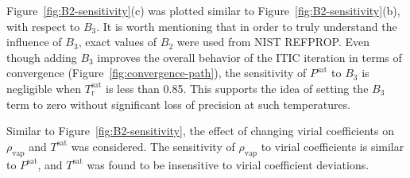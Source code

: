 \documentclass[5p,times]{elsarticle}
\begin{document}
Figure~\ref{fig:B2-sensitivity}(c) was plotted similar to Figure~\ref{fig:B2-sensitivity}(b), with respect to $B_3$. It is worth mentioning that in order to truly understand the influence of $B_3$, exact values of $B_2$ were used from NIST REFPROP. Even though adding $B_3$ improves the overall behavior of the ITIC iteration in terms of convergence (Figure~\ref{fig:convergence-path}), the sensitivity of $P^{\mathrm{sat}}$ to $B_3$ is negligible when $T_\mathrm{r}^\mathrm{sat}$ is less than 0.85. This supports the idea of setting the $B_3$ term to zero without significant loss of precision at such temperatures. 

Similar to Figure~\ref{fig:B2-sensitivity}, the effect of changing virial coefficients on $\rho_\mathrm{vap}$ and $T^\mathrm{sat}$ was considered. The sensitivity of $\rho_\mathrm{vap}$ to virial coefficients is similar to $P^\mathrm{sat}$, and $T^\mathrm{sat}$ was found to be insensitive to virial coefficient deviations.
\end{document}
